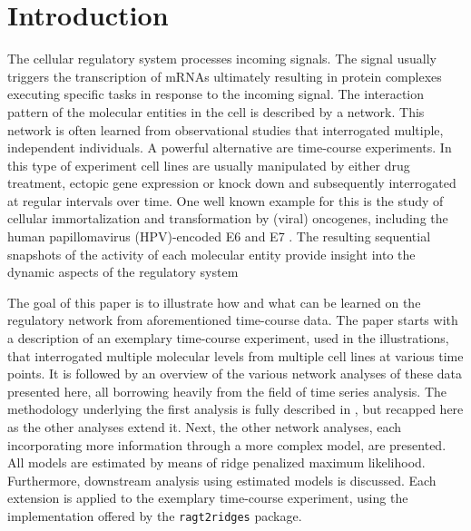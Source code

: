 \section{Introduction}
The cellular regulatory system processes incoming signals. The signal usually triggers the transcription of mRNAs ultimately resulting in protein complexes executing specific tasks in response to the incoming signal. The interaction pattern of the molecular entities in the cell is described by a network. This network is often learned from observational studies that interrogated multiple, independent individuals. A powerful alternative are time-course experiments. In this type of experiment cell lines are usually manipulated by either drug treatment, ectopic gene expression or knock down and subsequently interrogated at regular intervals over time. One well known example for this is the study of cellular immortalization and transformation by (viral) oncogenes, including the human papillomavirus (HPV)-encoded E6 and E7 \cite{Band1990, Durst1987, Park1991, Pecoraro1989, Pirisi1987, Willey1991}.  The resulting sequential snapshots of the activity of each molecular entity provide insight into the dynamic aspects of the regulatory system

The goal of this paper is to illustrate how and what can be learned on the regulatory network from aforementioned time-course data. The paper starts with a description of an exemplary time-course experiment, used in the illustrations, that interrogated multiple molecular levels from multiple cell lines at various time points. It is followed by an overview of the various network analyses of these data presented here, all borrowing heavily from the field of time series analysis. The methodology underlying the first analysis is fully described in \cite{Miok2017}, but recapped here as the other analyses extend it. Next, the other network analyses, each incorporating more information through a more complex model, are presented. All models are estimated by means of ridge penalized maximum likelihood. Furthermore, downstream analysis using estimated models is discussed. Each extension is applied to the exemplary time-course experiment, using the implementation offered by the \texttt{ragt2ridges} package.


